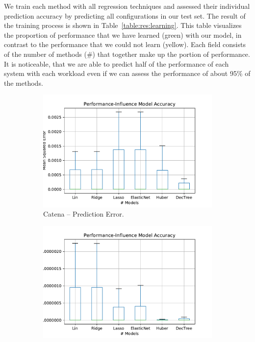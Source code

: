 We train each method with all regression techniques and assessed their individual prediction accuracy by predicting all configurations in our test set. The result of the training process is shown in Table~\ref{table:res:learning}. This table visualizes the proportion of performance that we have learned (green) with our model, in contrast to the performance that we could not learn (yellow). Each field consists of the number of methods (\#) that together make up the portion of performance. It is noticeable, that we are able to predict half of the performance of each system with each workload even if we can assess the performance of about 95\% of the methods. 

\begin{figure}[h]
	\centering
	\begin{subfigure}{.49\textwidth}
	  \centering
	  \includegraphics[width=\textwidth]{images/Catena_box_regression_model_overview_without_outl}
	  \caption{Catena -- Prediction Error.}
	  \label{box_model_cross_comp_catena}
	\end{subfigure}
	\begin{subfigure}{.49\textwidth}
	  \centering
	  \includegraphics[width=\textwidth]{images/H2_box_regression_model_overview_without_outl}

\end{subfigure}
\end{figure}
